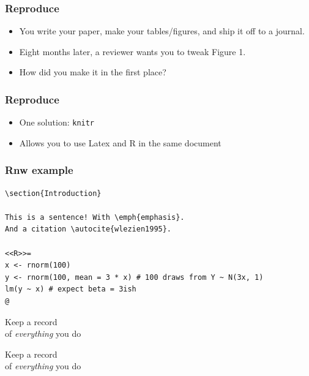 \documentclass[bigger, aspectratio=169]{beamer}
\begin{document}
\begin{frame}
  \frametitle{Reproduce}
  \begin{itemize}
  \item You write your paper, make your tables/figures, and ship it off to a journal.
  \item Eight months later, a reviewer wants you to tweak Figure 1.
  \item How did you make it in the first place? 
  \end{itemize}
\end{frame}

\begin{frame}
  \frametitle{Reproduce}
  \begin{itemize}
  \item One solution: \texttt{knitr}
  \item Allows you to use Latex and R in the same document
  \end{itemize}
\end{frame}

\begin{frame}[fragile]
  \frametitle{Rnw example}
\begin{verbatim}
\section{Introduction}

This is a sentence! With \emph{emphasis}. 
And a citation \autocite{wlezien1995}. 

<<R>>=
x <- rnorm(100) 
y <- rnorm(100, mean = 3 * x) # 100 draws from Y ~ N(3x, 1)
lm(y ~ x) # expect beta = 3ish
@
\end{verbatim}
\end{frame}

\begin{frame}[standout]
  Keep a record \\
  of \emph{everything} you do\\
\end{frame}

\begin{frame}[standout]
  \Huge{Keep a record} \\
  \Huge{of \emph{everything} you do}\\
\end{frame}
\end{document}
